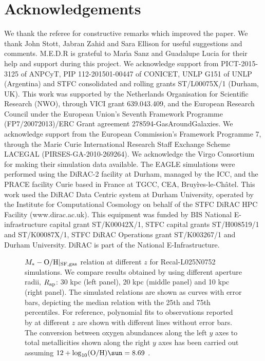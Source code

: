 \documentclass[useAMS,usenatbib]{mn2e}
\begin{document}
\section*{Acknowledgements}
We thank the referee for constructive remarks which improved the paper. 
We thank John Stott, Jabran Zahid and Sara Ellison for useful suggestions and comments.
M.E.D.R is grateful to Mar\'{\i}a Sanz and Guadalupe Lucia for their help and support during this project. 
We acknowledge support from PICT-2015-3125 of ANPCyT, PIP 112-201501-00447
of CONICET, UNLP G151 of UNLP (Argentina) and 
STFC consolidated and rolling grants ST/L00075X/1 (Durham, UK).
This work was supported by the Netherlands Organisation for Scientific Research (NWO), through VICI grant
639.043.409, and the European Research Council under the European Union's Seventh Framework Programme
(FP7/20072013)/ERC Grant agreement 278594-GasAroundGalaxies.
We acknowledge support from the European Commission's Framework Programme 7, 
through the Marie Curie International Research Staff Exchange Scheme LACEGAL (PIRSES-GA-2010-269264).
We acknowledge the Virgo Consortium for making their simulation data available. 
The EAGLE simulations were performed using the DiRAC-2 facility at Durham, managed by the ICC, 
and the PRACE facility Curie based in France at TGCC, CEA, Bruy\`res-le-Ch\^atel.
This work used the DiRAC Data Centric system at Durham University, operated by the Institute for Computational Cosmology on behalf of the STFC DiRAC HPC Facility (www.dirac.ac.uk). This equipment was funded by BIS National E-infrastructure capital grant ST/K00042X/1, STFC capital grants ST/H008519/1 and ST/K00087X/1, STFC DiRAC Operations grant ST/K003267/1 and Durham University. DiRAC is part of the National E-Infrastructure.






\begin{figure*}
\begin{center}
\end{center}
\caption[]
{
$M_* - {\rm O/H}|_{\rm SF,gas}$ relation at different $z$ for Recal-L025N0752 simulations.  
We compare results obtained by using different aperture radii, $R_{\rm ap}$: 30 kpc (left panel),
20 kpc (middle panel) and 10 kpc (right panel).
The simulated relations are shown as curves with error bars, depicting the median relation with the 25th and 75th
percentiles.  For reference, polynomial fits to observations reported by \citet{maiolino2008}
at different $z$ are shown with different lines without error bars.
The conversion between oxygen abundances along the left $y$ axes to total metallicities
shown along the right $y$ axes has been carried out assuming
$12+ \log_{10} ({\rm O/H})\sun = 8.69$ \citep{allende2001}.
}
\label{fig:mzr_ap}
\end{figure*}
\end{document}

